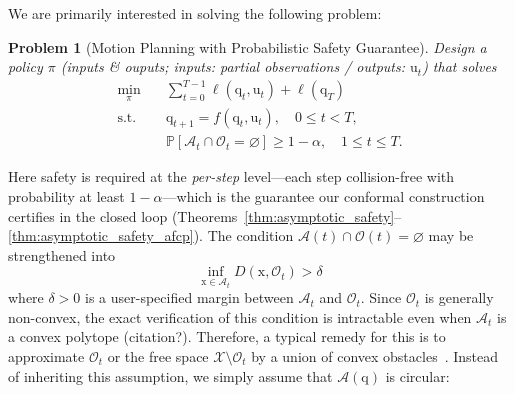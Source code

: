 \documentclass[lettersize,journal]{IEEEtran}
\newtheorem{problem}{Problem}
\begin{document}
We are primarily interested in solving the following problem:
\begin{problem}[Motion Planning with Probabilistic Safety Guarantee]\label{problem:general-motion-planning}
Design a policy $\pi$ {\color{teal}(inputs \& ouputs; inputs: partial observations / outputs: $\mathrm{u}_t$)} that solves
\begin{align}\label{eq:path-collision-constraint-general}
\min_{\pi}&\quad  \sum_{t=0}^{T-1} \ell(\mathrm{q}_t, \mathrm{u}_t) + \ell(\mathrm{q}_T) \nonumber \\
\text{s.t.}&\quad \mathrm{q}_{t+1} = f(\mathrm{q}_t, \mathrm{u}_t), \quad 0 \leq t < T, \nonumber \\
&\quad \mathbb{P}\left[ \mathcal{A}_t\cap \mathcal{O}_t = \varnothing \right] \geq  1 - \alpha, \quad 1\leq t \leq T.
\end{align}

\end{problem}
Here safety is required at the \emph{per-step} level---each step collision-free with probability at least $1-\alpha$---which is the guarantee our conformal construction certifies in the closed loop (Theorems~\ref{thm:asymptotic_safety}--\ref{thm:asymptotic_safety_afcp}).
The condition $\mathcal{A}(t) \cap \mathcal{O}(t) = \varnothing$ may be strengthened into
\begin{equation}\label{eq:collision-constraint-general}
\inf_{\mathrm{x} \in \mathcal{A}_t} D(\mathrm{x}, \mathcal{O}_t) > \delta
\end{equation}
where $\delta > 0$ is a user-specified margin between $\mathcal{A}_t$ and $\mathcal{O}_t$.
Since $\mathcal{O}_t$ is generally non-convex, the exact verification of this condition is intractable even when $\mathcal{A}_t$ is a convex polytope {\color{teal}(citation?)}. Therefore, a typical remedy for this is to approximate $\mathcal{O}_t$ or the free space $\mathcal{X} \setminus \mathcal{O}_t$ by a union of convex obstacles~\cite{zhang2020optimization,deits2015computing}. Instead of inheriting this assumption, we simply assume that $\mathcal{A}(\mathrm{q})$ is circular:
\end{document}
